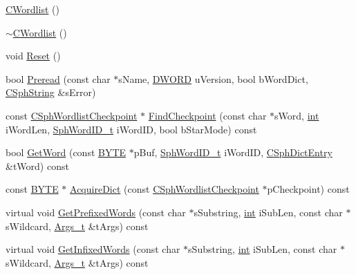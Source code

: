 \begin{DoxyCompactItemize}
\item 
\hyperlink{classCWordlist_a842ca1290d73156b9ef1abde841f2dcd}{C\-Wordlist} ()
\item 
\hyperlink{classCWordlist_a9ea86b57d00ad0eef3206e542578f086}{$\sim$\-C\-Wordlist} ()
\item 
void \hyperlink{classCWordlist_aaff63c6a3305d95f26aea4a5ab38fd17}{Reset} ()
\item 
bool \hyperlink{classCWordlist_a693380293dfca7da97ffb88ba49a8698}{Preread} (const char $\ast$s\-Name, \hyperlink{sphinxstd_8h_a798af1e30bc65f319c1a246cecf59e39}{D\-W\-O\-R\-D} u\-Version, bool b\-Word\-Dict, \hyperlink{structCSphString}{C\-Sph\-String} \&s\-Error)
\item 
const \hyperlink{structCSphWordlistCheckpoint}{C\-Sph\-Wordlist\-Checkpoint} $\ast$ \hyperlink{classCWordlist_ae60149da194aa4e72c40bd30750b7b38}{Find\-Checkpoint} (const char $\ast$s\-Word, \hyperlink{sphinxexpr_8cpp_a4a26e8f9cb8b736e0c4cbf4d16de985e}{int} i\-Word\-Len, \hyperlink{sphinx_8h_a80a94d5984fdf9214a98f3e5e65df963}{Sph\-Word\-I\-D\-\_\-t} i\-Word\-I\-D, bool b\-Star\-Mode) const 
\item 
bool \hyperlink{classCWordlist_a6cb222811e0d8fcba2216ef3039bbf0d}{Get\-Word} (const \hyperlink{sphinxstd_8h_a4ae1dab0fb4b072a66584546209e7d58}{B\-Y\-T\-E} $\ast$p\-Buf, \hyperlink{sphinx_8h_a80a94d5984fdf9214a98f3e5e65df963}{Sph\-Word\-I\-D\-\_\-t} i\-Word\-I\-D, \hyperlink{structCSphDictEntry}{C\-Sph\-Dict\-Entry} \&t\-Word) const 
\item 
const \hyperlink{sphinxstd_8h_a4ae1dab0fb4b072a66584546209e7d58}{B\-Y\-T\-E} $\ast$ \hyperlink{classCWordlist_a64cc5e9bcabbc48fc5f74276016847ae}{Acquire\-Dict} (const \hyperlink{structCSphWordlistCheckpoint}{C\-Sph\-Wordlist\-Checkpoint} $\ast$p\-Checkpoint) const 
\item 
virtual void \hyperlink{classCWordlist_ab0d586e1f52c5e7f444fe83578fda297}{Get\-Prefixed\-Words} (const char $\ast$s\-Substring, \hyperlink{sphinxexpr_8cpp_a4a26e8f9cb8b736e0c4cbf4d16de985e}{int} i\-Sub\-Len, const char $\ast$s\-Wildcard, \hyperlink{structISphWordlist_1_1Args__t}{Args\-\_\-t} \&t\-Args) const 
\item 
virtual void \hyperlink{classCWordlist_a63ffa1995a29ec8eeec96f1ed79f2e42}{Get\-Infixed\-Words} (const char $\ast$s\-Substring, \hyperlink{sphinxexpr_8cpp_a4a26e8f9cb8b736e0c4cbf4d16de985e}{int} i\-Sub\-Len, const char $\ast$s\-Wildcard, \hyperlink{structISphWordlist_1_1Args__t}{Args\-\_\-t} \&t\-Args) const 

\end{DoxyCompactItemize}
